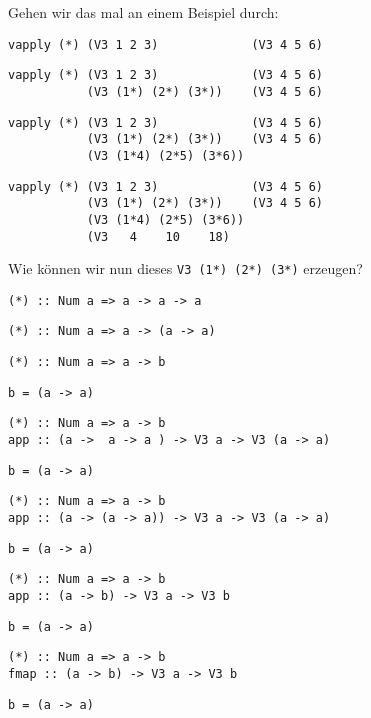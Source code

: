 \documentclass{beamer}
\begin{document}
\begin{frame}[fragile]
Gehen wir das mal an einem Beispiel durch:
\begin{overprint}
\begin{verbatim}
vapply (*) (V3 1 2 3)             (V3 4 5 6)
\end{verbatim}
\begin{verbatim}
vapply (*) (V3 1 2 3)             (V3 4 5 6)
           (V3 (1*) (2*) (3*))    (V3 4 5 6)
\end{verbatim}
\begin{verbatim}
vapply (*) (V3 1 2 3)             (V3 4 5 6)
           (V3 (1*) (2*) (3*))    (V3 4 5 6)
           (V3 (1*4) (2*5) (3*6))
\end{verbatim}
\begin{verbatim}
vapply (*) (V3 1 2 3)             (V3 4 5 6)
           (V3 (1*) (2*) (3*))    (V3 4 5 6)
           (V3 (1*4) (2*5) (3*6))
           (V3   4    10    18)
\end{verbatim}
\end{overprint}
\pause
\pause
\pause
\pause
\bigskip

Wie können wir nun dieses \texttt{V3 (1*) (2*) (3*)} erzeugen?
\pause
\begin{overprint}
\begin{verbatim}
(*) :: Num a => a -> a -> a
\end{verbatim}
\begin{verbatim}
(*) :: Num a => a -> (a -> a)
\end{verbatim}
\begin{verbatim}
(*) :: Num a => a -> b
\end{verbatim}
\texttt{b = (a -> a)}
\begin{verbatim}
(*) :: Num a => a -> b
app :: (a ->  a -> a ) -> V3 a -> V3 (a -> a)
\end{verbatim}
\texttt{b = (a -> a)}
\begin{verbatim}
(*) :: Num a => a -> b
app :: (a -> (a -> a)) -> V3 a -> V3 (a -> a)
\end{verbatim}
\texttt{b = (a -> a)}
\begin{verbatim}
(*) :: Num a => a -> b
app :: (a -> b) -> V3 a -> V3 b
\end{verbatim}
\texttt{b = (a -> a)}
\begin{verbatim}
(*) :: Num a => a -> b
fmap :: (a -> b) -> V3 a -> V3 b
\end{verbatim}
\texttt{b = (a -> a)}
\end{overprint}


\end{frame}
\end{document}
